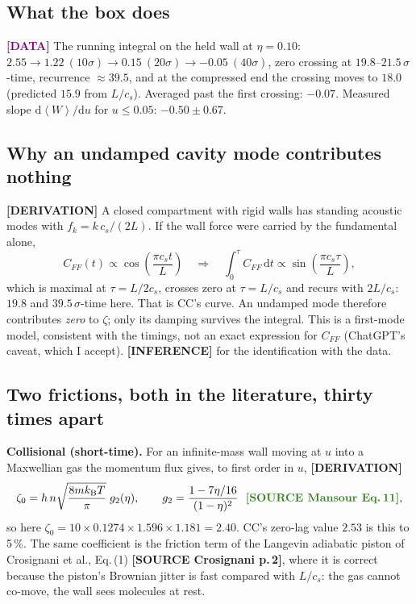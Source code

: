 \documentclass[11pt,a4paper]{article}
\newcommand{\kT}{k_{\mathrm B}T}
\newcommand{\avg}[1]{\left\langle #1 \right\rangle}
\newcommand{\dd}{\mathrm{d}}
\newcommand{\src}[1]{\textcolor{OliveGreen}{\textbf{[SOURCE #1]}}}
\newcommand{\der}{\textcolor{NavyBlue}{\textbf{[DERIVATION]}}}
\newcommand{\infr}{\textcolor{BurntOrange}{\textbf{[INFERENCE]}}}
\newcommand{\dat}{\textcolor{Purple}{\textbf{[DATA]}}}
\begin{document}
\subsection{What the box does}
\dat{} The running integral on the held wall at $\eta = 0.10$: $2.55 \to 1.22\ (10\sigma) \to 0.15\ (20\sigma) \to -0.05\ (40\sigma)$, zero crossing at $19.8$--$21.5\,\sigma$-time, recurrence $\approx 39.5$, and at the compressed end the crossing moves to $18.0$ (predicted $15.9$ from $L/c_s$). Averaged past the first crossing: $-0.07$. Measured slope $\dd\avg W/\dd u$ for $u \le 0.05$: $-0.50 \pm 0.67$.

\subsection{Why an undamped cavity mode contributes nothing}
\der{} A closed compartment with rigid walls has standing acoustic modes with $f_k = k\,c_s/(2L)$. If the wall force were carried by the fundamental alone,
\begin{equation}
C_{FF}(t) \propto \cos\!\left(\frac{\pi c_s t}{L}\right)
\quad\Longrightarrow\quad
\int_0^\tau C_{FF}\,\dd t \propto \sin\!\left(\frac{\pi c_s \tau}{L}\right),
\end{equation}
which is maximal at $\tau = L/2c_s$, crosses zero at $\tau = L/c_s$ and recurs with $2L/c_s$: $19.8$ and $39.5\,\sigma$-time here. That is CC's curve. An undamped mode therefore contributes \emph{zero} to $\zeta$; only its damping survives the integral. This is a first-mode model, consistent with the timings, not an exact expression for $C_{FF}$ (ChatGPT's caveat, which I accept). \infr{} for the identification with the data.

\subsection{Two frictions, both in the literature, thirty times apart}
\textbf{Collisional (short-time).} For an infinite-mass wall moving at $u$ into a Maxwellian gas the momentum flux gives, to first order in $u$, \der{}
\begin{equation}
\zeta_0 = h\,n\sqrt{\frac{8m\kT}{\pi}}\;g_2(\eta),
\qquad g_2 = \frac{1 - 7\eta/16}{(1-\eta)^2}\ \ \text{\src{Mansour Eq.\,11}},
\end{equation}
so here $\zeta_0 = 10\times0.1274\times1.596\times1.181 = 2.40$.
CC's zero-lag value $2.53$ is this to 5\,\%. The same coefficient is the friction term of the Langevin adiabatic piston of Crosignani et al., Eq.\,(1) \src{Crosignani p.\,2}, where it is correct because the piston's Brownian jitter is fast compared with $L/c_s$: the gas cannot co-move, the wall sees molecules at rest.
\end{document}

